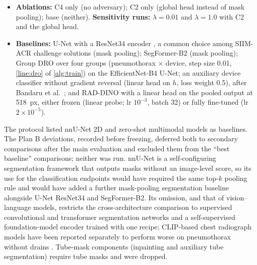\documentclass{ieeeaccess}
\begin{document}
\begin{itemize}
  \item \textbf{Ablations:} C4 only (no adversary); C2 only (global head instead of mask pooling); base (neither). \textbf{Sensitivity runs:} $\lambda=0.01$ and $\lambda=1.0$ with C2 and the global head.
  \item \textbf{Baselines:} U-Net with a ResNet34 encoder \cite{he2016resnet}, a common choice among SIIM-ACR challenge solutions (mask pooling); SegFormer-B2 \cite{xie2021segformer} (mask pooling); Group DRO \cite{sagawa2020groupdro} over four groups (pneumothorax $\times$ device, step size 0.01, \cref{line:dro} of \cref{alg:train}) on the EfficientNet-B4 U-Net; an auxiliary device classifier without gradient reversal (linear head on $h$, loss weight 0.5), after Bandaru et al.~\cite{bandaru2026untreated}; and RAD-DINO \cite{perezgarcia2025raddino} with a linear head on the pooled output at 518~px, either frozen (linear probe; lr $10^{-3}$, batch 32) or fully fine-tuned (lr $2\times10^{-5}$).
\end{itemize}

The protocol listed nnU-Net 2D \cite{isensee2021nnunet} and zero-shot multimodal models as baselines. The Plan B deviations, recorded before freezing, deferred both to secondary comparisons after the main evaluation and excluded them from the ``best baseline'' comparisons; neither was run. nnU-Net is a self-configuring segmentation framework that outputs masks without an image-level score, so its use for the classification endpoints would have required the same top-$k$ pooling rule and would have added a further mask-pooling segmentation baseline alongside U-Net ResNet34 and SegFormer-B2. Its omission, and that of vision--language models, restricts the cross-architecture comparison to supervised convolutional and transformer segmentation networks and a self-supervised foundation-model encoder trained with one recipe; CLIP-based chest radiograph models have been reported separately to perform worse on pneumothorax without drains \cite{sourget2025clip}. Tube-mask components (inpainting and auxiliary tube segmentation) require tube masks and were dropped.
\end{document}
